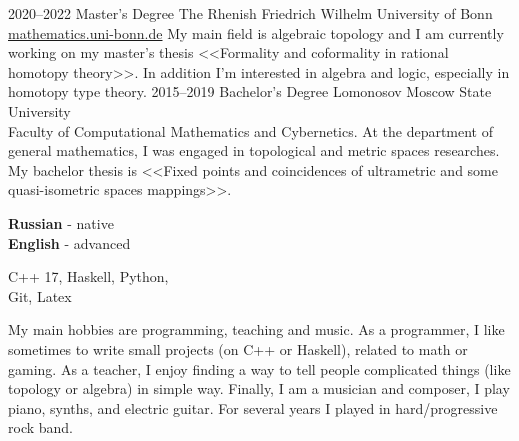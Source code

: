 \documentclass[9pt]{developercv} %
\begin{document}

\begin{entrylist}
	\entry
		{2020--2022}
		{Master's Degree}
		{The Rhenish Friedrich Wilhelm University of Bonn \\
		\null\hfill \href{https://www.mathematics.uni-bonn.de/}{mathematics.uni-bonn.de}}
		{My main field is algebraic topology and I am currently working on my master's thesis <<Formality and coformality in rational homotopy theory>>. In addition I'm interested in algebra and logic, especially in homotopy type theory.}
	\entry
		{2015--2019}
		{Bachelor's Degree}
		{Lomonosov Moscow State University \\ \null\hfill Faculty of Computational Mathematics and Cybernetics.}
		{
			At the department of general mathematics, I was engaged in topological and metric spaces researches. My bachelor thesis is <<Fixed points and coincidences of ultrametric and some quasi-isometric spaces mappings>>.
		}
\end{entrylist}


\begin{minipage}[t]{0.168\textwidth}
	\vspace{-\baselineskip} %

	
	\textbf{Russian} - native\\
	\textbf{English} - advanced\\
\end{minipage}
\hfill
\begin{minipage}[t]{0.2\textwidth}
	\vspace{-\baselineskip} %
	
	
	C++ 17, Haskell, Python,\\
	Git, Latex
\end{minipage}
\hfill
\begin{minipage}[t]{0.6\textwidth}
	\vspace{-\baselineskip} %
	
	
	My main hobbies are programming, teaching and music. As a programmer, I like sometimes to write small projects (on C++ or Haskell), related to math or gaming. As a teacher, I enjoy finding a way to tell people complicated things (like topology or algebra) in simple way. Finally, I am a musician and composer, I play piano, synths, and electric guitar. For several years I played in hard/progressive rock band.
	

	

\end{minipage}
\hfill


\end{document}
